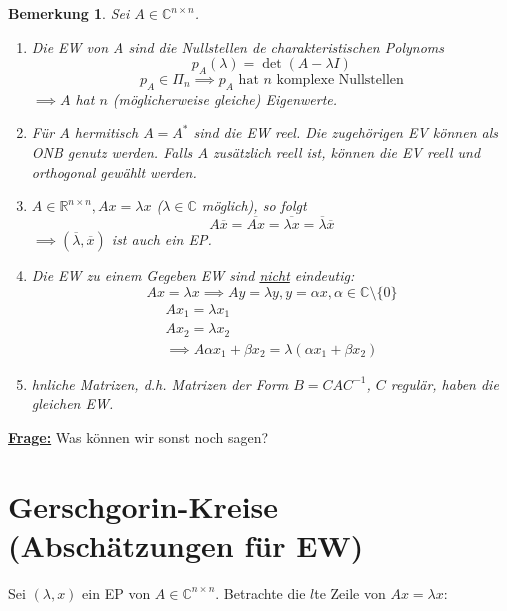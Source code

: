 \documentclass{book}
\newtheorem{remark}[algorithm]{Bemerkung}
\def\C{\mathbb{C}}
\def\R{\mathbb{R}}
\begin{document}
            \begin{remark}\label{b4.7}
                Sei $A\in\C^{n\times n}$.
                \begin{enumerate}
                    \item Die EW von A sind die Nullstellen de charakteristischen Polynoms
                        \[p_A(\lambda) = \det(A-\lambda I)\]
                        \[p_A\in\Pi_n\implies p_A\text{ hat } n \text{ komplexe Nullstellen}\]
                        $\implies A $ hat $n$ (möglicherweise gleiche)  Eigenwerte.
                    \item Für $A$ hermitisch $A=A^*$ sind die EW reel. Die zugehörigen EV können als ONB genutz werden. Falls $A$ zusätzlich reell ist, können die EV reell
                        und orthogonal gewählt werden.
                    \item $A\in\R^{n\times n},Ax=\lambda x$ ($\lambda\in \C$ möglich), so folgt 
                        \[A\overline{x}=\overline{Ax}=\overline{\lambda x} = \overline{\lambda}\overline{x}\]
                        $\implies (\overline{\lambda},\overline{x})$ ist auch ein EP.
                    \item Die EW zu einem Gegeben EW sind \underline{nicht} eindeutig:
                        \[Ax=\lambda x \implies Ay=\lambda y,y=\alpha x,\alpha\in\C\setminus\{0\}\]
                        \begin{align*}
                            Ax_1=\lambda x_1 \\
                            Ax_2=\lambda x_2\\
                            \implies A\alpha x_1 +\beta x_2 = \lambda(\alpha x_1 +\beta x_2)
                        \end{align*}
                    \item hnliche Matrizen, d.h. Matrizen der Form $B=CAC^{-1}$, $C$ regulär, haben die gleichen EW.
                \end{enumerate}
            \end{remark}

            \underline{\textbf{Frage:}} Was können wir sonst noch sagen? 
        
        \section{Gerschgorin-Kreise (Abschätzungen für EW)}

            Sei $(\lambda,x)$ ein EP von $A\in\C^{n\times n}$. Betrachte die $l$te Zeile von $Ax=\lambda x$:
\end{document}

